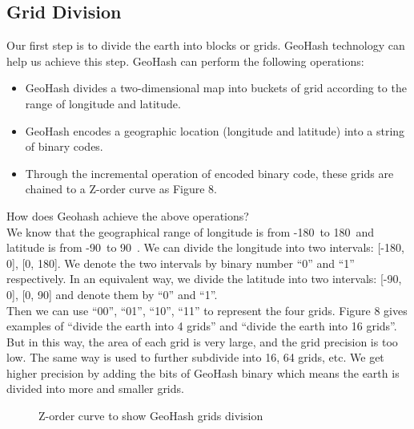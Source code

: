 \documentclass[sigplan,screen]{acmart}
\begin{document}
\subsection{Grid Division}
Our first step is to divide the earth into blocks or grids. GeoHash technology can help us achieve this step.
GeoHash can perform the following operations:
\begin{itemize}
	\item GeoHash divides a two-dimensional map into buckets of grid according to the range of longitude and latitude.
	\item GeoHash encodes a geographic location (longitude and latitude) into a string of binary codes.
	\item Through the incremental operation of encoded binary code, these grids are chained to a Z-order curve as Figure 8.
\end{itemize}
How does Geohash achieve the above operations?
\\
We know that the geographical range of longitude is from -180\degree\ to 180\degree\ and latitude is from -90\degree\ to 90\degree\ \cite{crossley1999guide}.
We can divide the longitude into two intervals: [-180\degree, 0\degree], [0\degree, 180\degree].
We denote the two intervals by binary number ``0'' and ``1'' respectively.
In an equivalent way, we divide the latitude into two intervals: [-90\degree, 0\degree], [0\degree, 90\degree] and denote them by ``0'' and ``1''.
\\
Then we can use ``00'', ``01'', ``10'', ``11'' to represent the four grids.
Figure 8 gives examples of ``divide the earth into 4 grids'' and ``divide the earth into 16 grids''.
But in this way, the area of each grid is very large, and the grid precision is too low.
The same way is used to further subdivide into 16, 64 grids, etc.
We get higher precision by adding the bits of GeoHash binary which means the earth is divided into more and smaller grids.
\begin{figure}[htb]
	\centering
	\caption{Z-order curve to show GeoHash grids division}
\end{figure}
\end{document}
